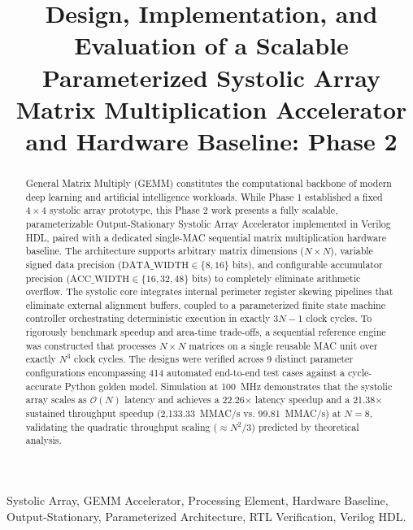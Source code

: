 \documentclass[conference]{IEEEtran}
\begin{document}
\title{Design, Implementation, and Evaluation of a Scalable Parameterized Systolic Array Matrix Multiplication Accelerator and Hardware Baseline: Phase 2}

\author{
}

\maketitle

\begin{abstract}
General Matrix Multiply (GEMM) constitutes the computational backbone of modern deep learning and artificial intelligence workloads. While Phase 1 established a fixed $4\times 4$ systolic array prototype, this Phase 2 work presents a fully scalable, parameterizable Output-Stationary Systolic Array Accelerator implemented in Verilog HDL, paired with a dedicated single-MAC sequential matrix multiplication hardware baseline. The architecture supports arbitrary matrix dimensions ($N \times N$), variable signed data precision ($\text{DATA\_WIDTH} \in \{8, 16\}$ bits), and configurable accumulator precision ($\text{ACC\_WIDTH} \in \{16, 32, 48\}$ bits) to completely eliminate arithmetic overflow. The systolic core integrates internal perimeter register skewing pipelines that eliminate external alignment buffers, coupled to a parameterized finite state machine controller orchestrating deterministic execution in exactly $3N-1$ clock cycles. To rigorously benchmark speedup and area-time trade-offs, a sequential reference engine was constructed that processes $N\times N$ matrices on a single reusable MAC unit over exactly $N^3$ clock cycles. The designs were verified across 9 distinct parameter configurations encompassing 414 automated end-to-end test cases against a cycle-accurate Python golden model. Simulation at 100~MHz demonstrates that the systolic array scales as $\mathcal{O}(N)$ latency and achieves a 22.26$\times$ latency speedup and a 21.38$\times$ sustained throughput speedup (2,133.33~MMAC/s vs. 99.81~MMAC/s) at $N=8$, validating the quadratic throughput scaling ($\approx N^2/3$) predicted by theoretical analysis.
\end{abstract}

\begin{IEEEkeywords}
Systolic Array, GEMM Accelerator, Processing Element, Hardware Baseline, Output-Stationary, Parameterized Architecture, RTL Verification, Verilog HDL.
\end{IEEEkeywords}
\end{document}
